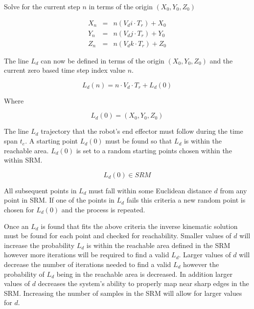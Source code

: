 Solve for the current step $n$ in terms of the origin $(X_0, Y_0, Z_0)$

\begin{eqnarray} 
X_n & = & n(V_di \cdot T_r) + X_0  \\
Y_n & = & n(V_dj \cdot T_r) + Y_0  \\
Z_n & = & n(V_dk \cdot T_r) + Z_0  
\end{eqnarray}

The line $L_d$ can now be defined in terms of the origin $(X_0, Y_0, Z_0)$ and the current zero based time step index value $n$.

\begin{equation}
L_d(n) = n \cdot V_d \cdot T_r + L_d(0)
\end{equation}


Where 

\begin{equation}
L_d(0) = (X_0, Y_0, Z_0)
\end{equation}



The line $L_d$ trajectory that the robot's end effector must follow during the time span $t_e$.  A starting point $L_d(0)$ must be found so that $L_d$ is within the reachable area.  $L_d(0)$ is set to a random starting points chosen within the within SRM.  

\begin{equation}
L_d(0) \in SRM
\end{equation}

All subsequent points in $L_d$ must fall within some Euclidean distance $d$ from any point in SRM.  If one of the points in $L_d$ fails this criteria a new random point is chosen for $L_d(0)$ and the process is repeated. 

Once an $L_d$ is found that fits the above criteria the inverse kinematic solution must be found for each point and checked for reachability.  Smaller values of $d$ will increase the probability $L_d$ is within the reachable area defined in the SRM however more iterations will be required to find a valid $L_d$.  Larger values of $d$ will decrease the number of iterations needed to find a valid $L_d$ however the probability of $L_d$ being in the reachable area is decreased.  In addition larger values of $d$ decreases the system's ability to properly map near sharp edges in the SRM.  Increasing the number of samples in the SRM will allow for larger values for $d$.

